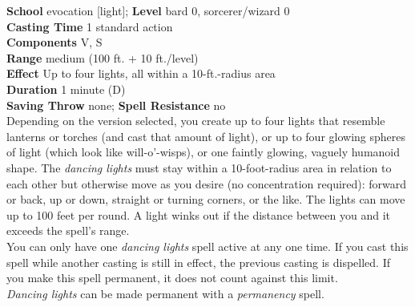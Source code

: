 \textbf{School} evocation [light]; \textbf{Level} bard 0, sorcerer/wizard 0\\
\textbf{Casting Time} 1 standard action\\
\textbf{Components} V, S\\
\textbf{Range }medium (100 ft. + 10 ft./level)\\
\textbf{Effect} Up to four lights, all within a 10-ft.-radius area\\
\textbf{Duration} 1 minute (D)\\
\textbf{Saving Throw} none; \textbf{Spell Resistance} no\\
Depending on the version selected, you create up to four lights that resemble lanterns or torches (and cast that amount of light), or up to four glowing spheres of light (which look like will-o'-wisps), or one faintly glowing, vaguely humanoid shape. The \textit{dancing lights }must stay within a 10-foot-radius area in relation to each other but otherwise move as you desire (no concentration required): forward or back, up or down, straight or turning corners, or the like. The lights can move up to 100 feet per round. A light winks out if the distance between you and it exceeds the spell's range.\\
You can only have one \textit{dancing lights} spell active at any one time. If you cast this spell while another casting is still in effect, the previous casting is dispelled. If you make this spell permanent, it does not count against this limit.\\
\textit{Dancing lights }can be made permanent with a \textit{permanency }spell.\\
